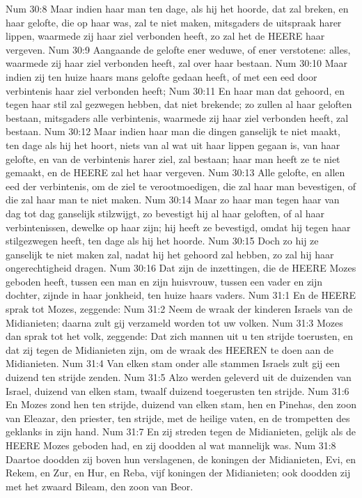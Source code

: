 Num 30:8  Maar indien haar man ten dage, als hij het hoorde, dat zal breken, en haar gelofte, die op haar was, zal te niet maken, mitsgaders de uitspraak harer lippen, waarmede zij haar ziel verbonden heeft, zo zal het de HEERE haar vergeven.
Num 30:9  Aangaande de gelofte ener weduwe, of ener verstotene: alles, waarmede zij haar ziel verbonden heeft, zal over haar bestaan.
Num 30:10  Maar indien zij ten huize haars mans gelofte gedaan heeft, of met een eed door verbintenis haar ziel verbonden heeft;
Num 30:11  En haar man dat gehoord, en tegen haar stil zal gezwegen hebben, dat niet brekende; zo zullen al haar geloften bestaan, mitsgaders alle verbintenis, waarmede zij haar ziel verbonden heeft, zal bestaan.
Num 30:12  Maar indien haar man die dingen ganselijk te niet maakt, ten dage als hij het hoort, niets van al wat uit haar lippen gegaan is, van haar gelofte, en van de verbintenis harer ziel, zal bestaan; haar man heeft ze te niet gemaakt, en de HEERE zal het haar vergeven.
Num 30:13  Alle gelofte, en allen eed der verbintenis, om de ziel te verootmoedigen, die zal haar man bevestigen, of die zal haar man te niet maken.
Num 30:14  Maar zo haar man tegen haar van dag tot dag ganselijk stilzwijgt, zo bevestigt hij al haar geloften, of al haar verbintenissen, dewelke op haar zijn; hij heeft ze bevestigd, omdat hij tegen haar stilgezwegen heeft, ten dage als hij het hoorde.
Num 30:15  Doch zo hij ze ganselijk te niet maken zal, nadat hij het gehoord zal hebben, zo zal hij haar ongerechtigheid dragen.
Num 30:16  Dat zijn de inzettingen, die de HEERE Mozes geboden heeft, tussen een man en zijn huisvrouw, tussen een vader en zijn dochter, zijnde in haar jonkheid, ten huize haars vaders.
Num 31:1  En de HEERE sprak tot Mozes, zeggende:
Num 31:2  Neem de wraak der kinderen Israels van de Midianieten; daarna zult gij verzameld worden tot uw volken.
Num 31:3  Mozes dan sprak tot het volk, zeggende: Dat zich mannen uit u ten strijde toerusten, en dat zij tegen de Midianieten zijn, om de wraak des HEEREN te doen aan de Midianieten.
Num 31:4  Van elken stam onder alle stammen Israels zult gij een duizend ten strijde zenden.
Num 31:5  Alzo werden geleverd uit de duizenden van Israel, duizend van elken stam, twaalf duizend toegerusten ten strijde.
Num 31:6  En Mozes zond hen ten strijde, duizend van elken stam, hen en Pinehas, den zoon van Eleazar, den priester, ten strijde, met de heilige vaten, en de trompetten des geklanks in zijn hand.
Num 31:7  En zij streden tegen de Midianieten, gelijk als de HEERE Mozes geboden had, en zij doodden al wat mannelijk was.
Num 31:8  Daartoe doodden zij boven hun verslagenen, de koningen der Midianieten, Evi, en Rekem, en Zur, en Hur, en Reba, vijf koningen der Midianieten; ook doodden zij met het zwaard Bileam, den zoon van Beor.
